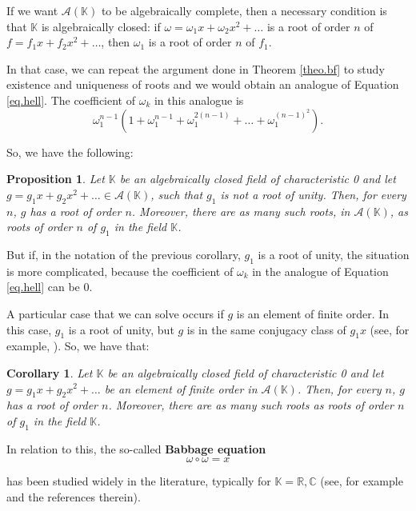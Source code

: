 \documentclass[preprint,12pt]{elsarticle}
\newtheorem{prop}[thm]{Proposition}
\newtheorem{coro}[thm]{Corollary}
\begin{document}
If we want $\mathcal A(\mathbb K)$ to be algebraically complete, then a necessary condition is that $\mathbb K$ is algebraically closed: if $\omega=\omega_1x+\omega_2x^2+\ldots$ is a root of order $n$ of $f=f_1x+f_2x^2+\ldots$, then $\omega_1$ is a root of order $n$ of $f_1$.

In that case, we can repeat the argument done in Theorem \ref{theo.bf} to study existence and uniqueness of roots and we would obtain an analogue of Equation \eqref{eq.hell}. The coefficient of $\omega_k$ in this analogue is
$$\omega_1^{n-1}(1+\omega_1^{n-1}+\omega_1^{2(n-1)}+\ldots+\omega_1^{(n-1)^2}).$$

\noindent So, we have the following:

\begin{prop} Let $\mathbb K$ be an algebraically closed field of characteristic 0 and let $g=g_1x+g_2x^2+\ldots \in \mathcal A(\mathbb K)$, such that $g_1$ is not a root of unity. Then, for every $n$, $g$ has a root of order $n$. Moreover, there are as many such roots, in $\mathcal A(\mathbb K)$, as roots of order $n$ of $g_1$ in the field $\mathbb K$.
\end{prop}






But if, in the notation of the previous corollary, $g_1$ is a root of unity, the situation is more complicated, because the coefficient of $\omega_k$ in the analogue of Equation \eqref{eq.hell} can be 0. 

A particular case that we can solve occurs if $g$ is an element of finite order. In this case, $g_1$ is a root of unity, but $g$ is in the same conjugacy class of $g_1x$ (see, for example, \cite{CPT,Sc}). So, we have that:



\begin{coro} Let $\mathbb K$ be an algebraically closed field of characteristic 0 and let $g=g_1x+g_2x^2+\ldots$ be an element of finite order in $\mathcal A(\mathbb K)$. Then, for every $n$, $g$ has a root of order $n$. Moreover, there are as many such roots as roots of order $n$ of $g_1$ in the field $\mathbb K$.
    
\end{coro}


 
In relation to this, the so-called \textbf{Babbage equation}
$$\omega\circ\omega=x $$

\noindent  has been studied widely in the literature, typically for $\mathbb K=\mathbb R,\mathbb C$ (see, for example \cite{LMP2} and the references therein).
\end{document}
